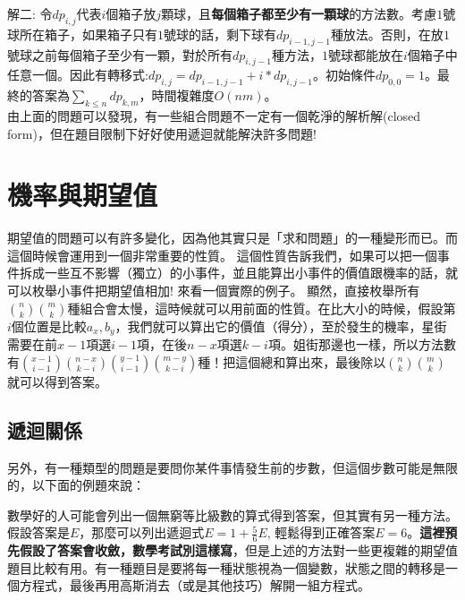 \documentclass[main.tex]{subfiles}
\begin{document}
解二: 令$dp_{i, j}$代表$i$個箱子放$j$顆球，且\textbf{每個箱子都至少有一顆球}的方法數。考慮$1$號球所在箱子，如果箱子只有$1$號球的話，剩下球有$dp_{i-1, j-1}$種放法。否則，在放$1$號球之前每個箱子至少有一顆，對於所有$dp_{i, j-1}$種方法，$1$號球都能放在$i$個箱子中任意一個。因此有轉移式:$dp_{i, j} = dp_{i-1, j-1} + i * dp_{i, j-1}$。初始條件$dp_{0, 0} = 1$。最終的答案為$\sum_{k \leq n} dp_{k, m}$，時間複雜度$O(nm)$。 \\

由上面的問題可以發現，有一些組合問題不一定有一個乾淨的解析解(closed form)，但在題目限制下好好使用遞迴就能解決許多問題!
\newpage
\section{機率與期望值}
期望值的問題可以有許多變化，因為他其實只是「求和問題」的一種變形而已。而這個時候會運用到一個非常重要的性質。
這個性質告訴我們，如果可以把一個事件拆成一些互不影響（獨立）的小事件，並且能算出小事件的價值跟機率的話，就可以枚舉小事件把期望值相加! 來看一個實際的例子。
顯然，直接枚舉所有$\binom{n}{k} \binom{m}{k}$種組合會太慢，這時候就可以用前面的性質。在比大小的時候，假設第$i$個位置是比較$a_x, b_y$，我們就可以算出它的價值（得分），至於發生的機率，星街需要在前$x-1$項選$i-1$項，在後$n-x$項選$k-i$項。姐街那邊也一樣，所以方法數有$\binom{x-1}{i-1} \binom{n-x}{k-i} \binom{y-1}{i-1} \binom{m - y}{k-i}$種！把這個總和算出來，最後除以$\binom{n}{k} \binom{m}{k}$就可以得到答案。
\subsection{遞迴關係}
\par 另外，有一種類型的問題是要問你某件事情發生前的步數，但這個步數可能是無限的，以下面的例題來說：
\par 數學好的人可能會列出一個無窮等比級數的算式得到答案，但其實有另一種方法。假設答案是$E$，那麼可以列出遞迴式$E = 1 + \frac{5}{6}E$, 輕鬆得到正確答案$E = 6$。\textbf{這裡預先假設了答案會收斂，數學考試別這樣寫}，但是上述的方法對一些更複雜的期望值題目比較有用。有一種題目是要將每一種狀態視為一個變數，狀態之間的轉移是一個方程式，最後再用高斯消去（或是其他技巧）解開一組方程式。
\end{document}
